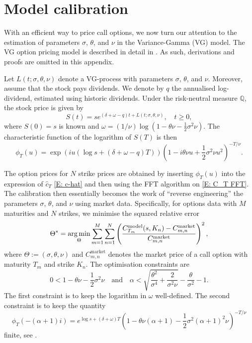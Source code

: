 \section{Model calibration}
\label{appendix: Model calibration}
With an efficient way to price call options, we now turn our attention to the estimation of parameters $\sigma$, $\theta$, and $\nu$ in the Variance-Gamma (VG) model. The VG option pricing model is described in detail in \cite{madan1998variance}. As such, derivations and proofs are omitted in this appendix. 

Let $L(t;\sigma,\theta,\nu)$ denote a VG-process with parameters $\sigma$, $\theta$, and $\nu$. Moreover, assume that the stock pays dividends. We denote by $q$ the annualised log-dividend, estimated using historic dividends. Under the risk-neutral measure $\mathbb{Q}$, the stock price is given by 
\begin{equation}
    S(t) = s e^{(\delta+\omega-q)t + L(t;\sigma,\theta,\nu)}, \quad t\geq0,
    \label{E: VG Stock price process}
\end{equation}
where $S(0)=s$ is known and $\omega = (1/\nu) \log (1-\theta \nu - \frac{1}{2}\sigma^2\nu)$. The characteristic function of the logarithm of $S(T)$ is then
\begin{equation*}
    \phi_T(u) = \exp\left(iu\left(\log s + (\delta+\omega-q)T\right)\right) \left(1-i\theta\nu u + \frac{1}{2}\sigma^2\nu u^2 \right)^{-T/\nu}.
\end{equation*}

The option prices for $N$ strike prices are obtained by inserting $\phi_T(u)$ into the expression of $\hat c_T$ \eqref{E: c-hat} and then using the FFT algorithm on \eqref{E: C_T FFT}. The calibration then essentially becomes the work of ``reverse engineering'' the parameters $\sigma$, $\theta$, and $\nu$ using market data. Specifically, for options data with $M$ maturities and $N$ strikes, we minimise the squared relative error
\begin{equation}
    \Theta^* = \operatorname*{arg\,min}_{\Theta} \sum_{m=1}^M \sum_{n=1}^N \left( \frac{C^{\text{model}}_{T_m}(s,K_n) - C^{\text{market}}_{m,n}}{C^{\text{market}}_{m,n}} \right)^2,
    \label{E: minimisation problem}
\end{equation}
where $\Theta := (\sigma, \theta, \nu)$ and $C^{\text{market}}_{m,n}$ denotes the market price of a call option with maturity $T_m$ and strike $K_n$. The optimisation constraints are
\begin{equation*}
    0 < 1-\theta \nu - \frac{1}{2} \sigma^2 \nu \quad \text{and} \quad \alpha < \sqrt{\frac{\theta^2}{\sigma^4} + \frac{2}{\sigma^2 \nu}} - \frac{\theta}{\sigma^2} - 1.
\end{equation*}
The first constraint is to keep the logarithm in $\omega$ well-defined. The second constraint is to keep the quantity 
\begin{equation*}
    \phi_T(-(\alpha+1)i) = e^{\log s + (\delta+\omega)T} \left( 1-\theta \nu (\alpha+1) - \frac{1}{2}\sigma^2 (\alpha + 1)^2 \nu \right)^{-T/\nu}
\end{equation*}
finite, see \cite[Section 5]{carr1999option}. 

